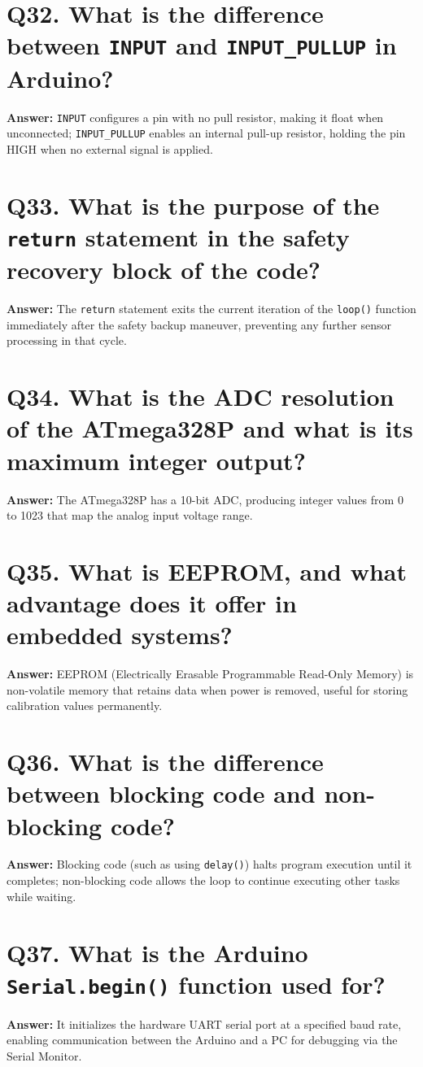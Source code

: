 \documentclass[12pt,a4paper,oneside]{report}
\begin{document}
\section{Q32. What is the difference between \texttt{INPUT} and \texttt{INPUT\_PULLUP} in Arduino?}
\textbf{Answer:} \texttt{INPUT} configures a pin with no pull resistor, making it float when unconnected; \texttt{INPUT\_PULLUP} enables an internal pull-up resistor, holding the pin HIGH when no external signal is applied.

\section{Q33. What is the purpose of the \texttt{return} statement in the safety recovery block of the code?}
\textbf{Answer:} The \texttt{return} statement exits the current iteration of the \texttt{loop()} function immediately after the safety backup maneuver, preventing any further sensor processing in that cycle.

\section{Q34. What is the ADC resolution of the ATmega328P and what is its maximum integer output?}
\textbf{Answer:} The ATmega328P has a 10-bit ADC, producing integer values from 0 to 1023 that map the analog input voltage range.

\section{Q35. What is EEPROM, and what advantage does it offer in embedded systems?}
\textbf{Answer:} EEPROM (Electrically Erasable Programmable Read-Only Memory) is non-volatile memory that retains data when power is removed, useful for storing calibration values permanently.

\section{Q36. What is the difference between blocking code and non-blocking code?}
\textbf{Answer:} Blocking code (such as using \texttt{delay()}) halts program execution until it completes; non-blocking code allows the loop to continue executing other tasks while waiting.

\section{Q37. What is the Arduino \texttt{Serial.begin()} function used for?}
\textbf{Answer:} It initializes the hardware UART serial port at a specified baud rate, enabling communication between the Arduino and a PC for debugging via the Serial Monitor.
\end{document}
